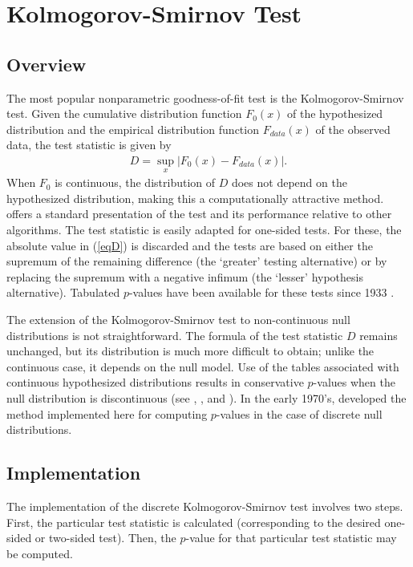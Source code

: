 \section{Kolmogorov-Smirnov Test}


\subsection{Overview}

The most popular nonparametric goodness-of-fit test is the
Kolmogorov-Smirnov test.
Given the cumulative distribution
function $F_0(x)$ of the hypothesized distribution
and the empirical distribution function $F_{data}(x)$ of the
observed data,  the test statistic is given by
\begin{align}
D = \sup_x \left| F_0(x)- F_{data}(x) \right|.    \label{eqD}
\end{align}
When $F_0$ is continuous, 
the distribution of $D$ does not depend on the hypothesized
distribution, making this a computationally
attractive method. \cite{slakter1965} offers a standard presentation
of the test and its
performance relative to other algorithms. 
The test statistic is easily adapted for one-sided tests.
For these, the absolute value in (\ref{eqD}) is discarded and the tests are based
on either the supremum of the remaining difference (the `greater' testing
alternative) or by replacing the supremum with a negative infimum
(the `lesser' hypothesis alternative).  Tabulated $p$-values have been
available for these tests since 1933 \citep{kol33}.

The extension of the Kolmogorov-Smirnov test to non-continuous 
null distributions is not straightforward. The formula of
the test statistic $D$ remains unchanged, but its distribution
is much more difficult to obtain; unlike the 
continuous case, it depends on the null model.
Use of the tables associated
with continuous hypothesized distributions results in conservative $p$-values
when the null distribution is discontinuous 
(see \cite{slakter1965}, \cite{goodman1954}, and \cite{massey1951}).  
In the early 1970's, 
\citet{Conover1972} developed the method implemented here
for computing $p$-values
in the case of discrete null distributions.

\subsection{Implementation}

The implementation of the discrete Kolmogorov-Smirnov test involves
two steps. First, the particular test statistic is calculated
(corresponding to the desired one-sided or two-sided test).
Then, the $p$-value for that particular test statistic may be computed. 

